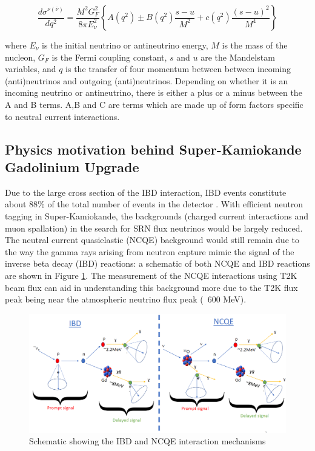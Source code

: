 \begin{equation}
\frac{d \sigma^{\nu(\bar{\nu})}}{d q^{2}}=\frac{M^{2} G_{F}^{2}}{8 \pi E_{\nu}^{2}}\left\{A\left(q^{2}\right) \pm B\left(q^{2}\right) \frac{s-u}{M^{2}}+c\left(q^{2}\right) \frac{(s-u)^{2}}{M^{4}}\right\}
\label{NCQExsec}
\end{equation}
    
where $E_{\nu}$ is the initial neutrino or antineutrino energy, $M$ is the mass of the nucleon, $G_{F}$ is the Fermi coupling constant, $s$ and $u$ are the Mandelstam variables, and $q$ is the transfer of four momentum between between incoming (anti)neutrinos and outgoing (anti)neutrinos. Depending on whether it is an incoming neutrino or antineutrino, there is either a plus or a minus between the A and B terms. A,B and C are terms which are made up of form factors specific to neutral current interactions.


\subsection{Physics motivation behind Super-Kamiokande Gadolinium Upgrade}

Due to the large cross section of the IBD interaction, IBD events constitute about 88\% of the total number of events in the detector \cite{marti_evaluation_2020}. With efficient neutron tagging in Super-Kamiokande, the backgrounds (charged current interactions and muon spallation) in the search for SRN flux neutrinos would be largely reduced. The neutral current quasielastic (NCQE) background would still remain due to the way the gamma rays arising from neutron capture mimic the signal of the inverse beta decay (IBD) reactions: a schematic of both NCQE and IBD reactions are shown in Figure \ref{fig:NCQE_IBD}. The measurement of the NCQE interactions using T2K beam flux can aid in understanding this background more due to the T2K flux peak being near the atmospheric neutrino flux peak (~600 MeV). 


\begin{figure}[H]
    \includegraphics[width=\textwidth]{Figures/schematic.png}
\caption{Schematic showing the IBD and NCQE interaction mechanisms}
\label{fig:NCQE_IBD}
\end{figure}


